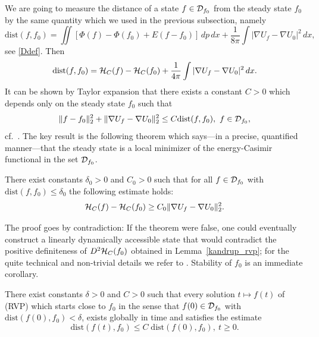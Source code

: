 \documentclass[11pt]{article}
\begin{document}
We are going to measure the distance of a state $f\in {\cal D}_{f_0}$ 
from the steady state $f_0$ by the same quantity which we used
in the previous subsection, namely
\[
\mathrm{dist}(f,f_0) = \iint[\Phi(f)-\Phi(f_0)+E (f-f_0)]\,dp\, dx
+\frac{1}{8\pi}\int|\nabla U_f-\nabla U_0|^2\,dx,
\]
see \eqref{Ddef}. Then
\begin{equation} \label{decrel}
  \mathrm{dist}(f,f_0)
  = {\cal H}_C(f)- {\cal H}_C(f_0)+\frac{1}{4\pi}\int|\nabla U_f-\nabla U_0|^2\,dx.
\end{equation}
It can be shown by Taylor expansion
that there exists a constant $C>0$ which depends
only on the steady state $f_0$ such that
\[ 
\|f - f_0\|_2^2 + \|\nabla U_f-\nabla U_0\|_2^2
\leq C \mathrm{dist}(f,f_0),\ f\in {\cal D}_{f_0},
\]
cf.~\cite[Lemma~3.1]{HaRe2007}.
The key result is the following theorem
which says---in a precise, quantified manner---that
the steady state is a local minimizer of the energy-Casimir functional
in the set ${\cal D}_{f_0}$.
%
\begin{theorem}\label{locmin_rvp}
  There exist constants $\delta_0>0$ and $C_0>0$ such that for 
  all $f\in {\cal D}_{f_0}$ with $\mathrm{dist}(f,f_0)\leq\delta_0$ the
  following estimate holds:
  \[
  {\cal H}_C(f)- {\cal H}_C(f_0)\geq C_0 \|\nabla U_f-\nabla U_0\|_2^2.
  \]
\end{theorem}
%
The proof goes by contradiction: If the theorem were false, one could
eventually construct a linearly dynamically accessible state that would
contradict the positive definiteness of $D^2{\cal H}_C (f_0)$ obtained in
Lemma~\ref{kandrup_rvp}; for the quite technical and non-trivial details
we refer to
\cite{HaRe2007}.  Stability of $f_0$ is an immediate corollary.
%
%
\begin{theorem}\label{nlstab_rvp}
  There exist constants $\delta >0$ and $C>0$ such that 
  every solution $t\mapsto f(t)$ of (RVP) which starts close to $f_0$
  in the sense that $f(0) \in {\cal D}_{f_0}$ with
  $\mathrm{dist}(f(0),f_{0}) < \delta$,
  exists globally in time and satisfies the estimate
  \[
  \mathrm{dist}(f(t),f_{0}) \leq C \; \mathrm{dist}(f(0),f_{0}),\ t\geq 0.
  \]
\end{theorem}
%
%
\end{document}
